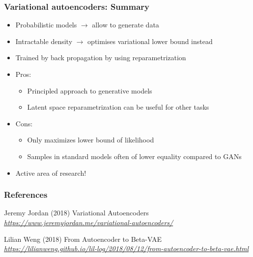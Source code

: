 
\begin{frame}
\frametitle{Variational autoencoders: Summary}

\begin{itemize}
  \item Probabilistic models $\rightarrow$ allow to generate data
  \item Intractable density $\rightarrow$ optimises variational lower bound instead
  \item Trained by back propagation by using reparametrization
  \pause
  \item Pros:
    \begin{itemize}
      \item Principled approach to generative models
      \item Latent space reparametrization can be useful for other tasks
    \end{itemize}  
  \pause
  \item Cons:
    \begin{itemize}
      \item Only maximizes lower bound of likelihood
      \item Samples in standard models often of lower equality compared to GANs
    \end{itemize} 
  \item Active area of research!
\end{itemize}

\end{frame}




\begin{vbframe}
\frametitle{References}
\footnotesize{
\begin{thebibliography}{99}
 Jeremy Jordan (2018)
\newblock Variational Autoencoders
\newblock \emph{\url{https://www.jeremyjordan.me/variational-autoencoders/}}

 Lilian Weng (2018)
\newblock From Autoencoder to Beta-VAE
\newblock \emph{\url{https://lilianweng.github.io/lil-log/2018/08/12/from-autoencoder-to-beta-vae.html}}

\end{thebibliography}
}
\end{vbframe}


